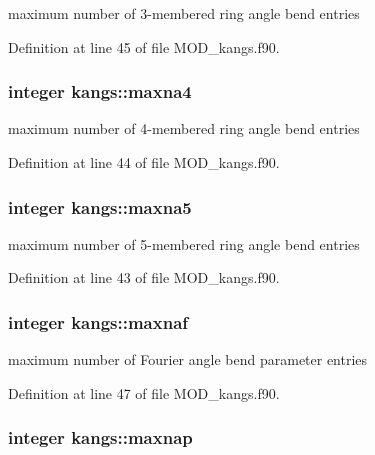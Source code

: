 maximum number of 3-\/membered ring angle bend entries 



Definition at line 45 of file M\-O\-D\-\_\-kangs.\-f90.

\hypertarget{classkangs_a65b59f16cd39d33f1686bf32e362e6c9}{
\subsubsection[{maxna4}]{\setlength{\rightskip}{0pt plus 5cm}integer kangs\-::maxna4}}\label{classkangs_a65b59f16cd39d33f1686bf32e362e6c9}


maximum number of 4-\/membered ring angle bend entries 



Definition at line 44 of file M\-O\-D\-\_\-kangs.\-f90.

\hypertarget{classkangs_af188b59476d50504dd8aa39359285894}{
\subsubsection[{maxna5}]{\setlength{\rightskip}{0pt plus 5cm}integer kangs\-::maxna5}}\label{classkangs_af188b59476d50504dd8aa39359285894}


maximum number of 5-\/membered ring angle bend entries 



Definition at line 43 of file M\-O\-D\-\_\-kangs.\-f90.

\hypertarget{classkangs_a3f749f34ae8245564a10206341a2dbdd}{
\subsubsection[{maxnaf}]{\setlength{\rightskip}{0pt plus 5cm}integer kangs\-::maxnaf}}\label{classkangs_a3f749f34ae8245564a10206341a2dbdd}


maximum number of Fourier angle bend parameter entries 



Definition at line 47 of file M\-O\-D\-\_\-kangs.\-f90.

\hypertarget{classkangs_aaa36915cbec793691849f7f04c409e24}{
\subsubsection[{maxnap}]{\setlength{\rightskip}{0pt plus 5cm}integer kangs\-::maxnap}}\label{classkangs_aaa36915cbec793691849f7f04c409e24}


